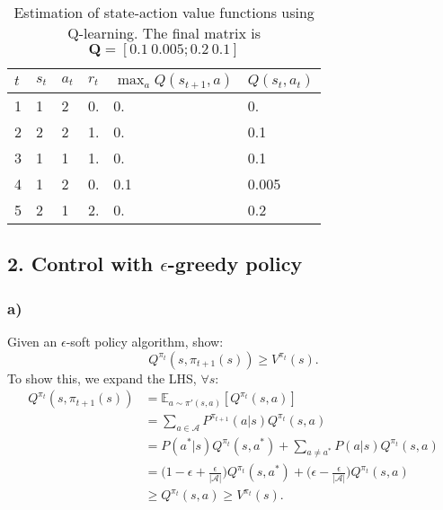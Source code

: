 \documentclass[12pt]{article}
\begin{document}
\begin{table}[H]
    \centering
    \caption{Estimation of state-action value functions using Q-learning. The final matrix is $\mathbf{Q} = [0.1~0.005; 0.2~0.1]$}
    \label{tab:Qlearn}
    \begin{tabular}{|l|l|l|l|l|l|}
    \hline
    $t$ & $s_{t}$ & $a_t$ & $r_{t}$ & $\max_aQ(s_{t+1}, a)$ & $Q(s_t, a_t)$ \\ \hline
    1   & 1       & 2     & 0.      & 0.                    & 0.            \\ \hline
    2   & 2       & 2     & 1.      & 0.                    & 0.1           \\ \hline
    3   & 1       & 1     & 1.      & 0.                    & 0.1           \\ \hline
    4   & 1       & 2     & 0.      & 0.1                   & 0.005         \\ \hline
    5   & 2       & 1     & 2.      & 0.                    & 0.2           \\ \hline
    \end{tabular}
\end{table}


\subsection*{2. Control with $\epsilon$-greedy policy}
\subsubsection*{a)}
Given an $\epsilon$-soft policy algorithm, show:
\begin{equation}
	Q^{\pi_t}(s,\pi_{t+1}(s)) \geq V^{\pi_t}(s).
\end{equation}
To show this, we expand the LHS, $\forall s$:
\begin{equation}
	\begin{split}
		Q^{\pi_t}(s,\pi_{t+1}(s)) &= \mathbb{E}_{a\sim\pi'(s,a)}[Q^{\pi_{t}}(s,a)] \\
		&= \sum_{a \in \mathcal{A}} P^{\pi_{t+1}}(a|s)Q^{\pi_{t}}(s,a) \\
		&= P(a^*|s)Q^{\pi_{t}}(s,a^*) + \sum_{a \neq a^*}P(a|s)Q^{\pi_{t}}(s,a) \\
		&=\Big(1-\epsilon+\frac{\epsilon}{|\mathcal{A}|}\Big)Q^{\pi_{t}}(s,a^*) + \Big(\epsilon - \frac{\epsilon}{|\mathcal{A}|}\Big)Q^{\pi_{t}}(s,a) \\
		&\geq Q^{\pi_{t}}(s,a) \geq V^{\pi_t}(s).
	\end{split}
\end{equation}
\end{document}
